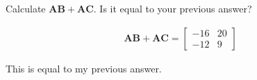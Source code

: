 Calculate $\boldsymbol{AB} + \boldsymbol{AC}$. Is it equal to your previous answer?

\begin{solution}
\begin{align*}
    \boldsymbol{AB} + \boldsymbol{AC} = \begin{bmatrix}
    -16 & 20 \\
    -12 & 9
    \end{bmatrix}
\end{align*}

This is equal to my previous answer.
\end{solution}